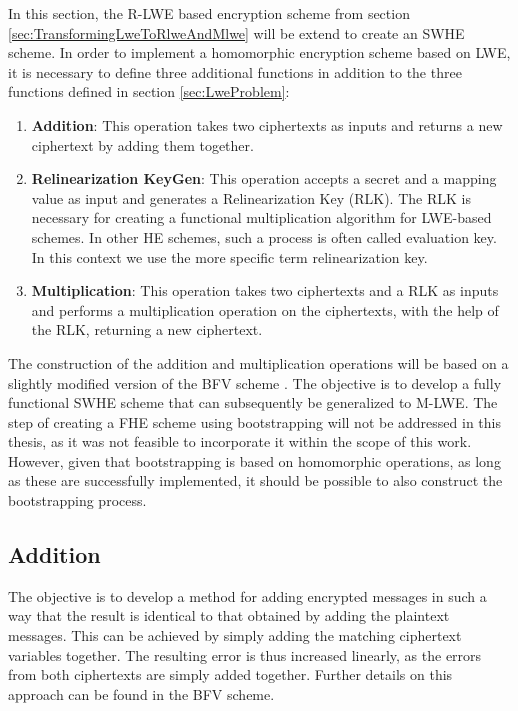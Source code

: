 In this section, the R-LWE based encryption scheme from section \ref{sec:TransformingLweToRlweAndMlwe} will be extend to create an SWHE scheme. In order to implement a homomorphic encryption scheme based on LWE, it is necessary to define three additional functions in addition to the three functions defined in section \ref{sec:LweProblem}:

\begin{enumerate}
  \item \textbf{Addition}: This operation takes two ciphertexts as inputs and returns a new ciphertext by adding them together.
  \item \textbf{Relinearization KeyGen}: This operation accepts a secret and a mapping value as input and generates a Relinearization Key (RLK). The RLK is necessary for creating a functional multiplication algorithm for LWE-based schemes. In other HE schemes, such a process is often called evaluation key. In this context we use the more specific term relinearization key.
  \item \textbf{Multiplication}: This operation takes two ciphertexts and a RLK as inputs and performs a multiplication operation on the ciphertexts, with the help of the RLK, returning a new ciphertext.
\end{enumerate}

The construction of the addition and multiplication operations will be based on a slightly modified version of the BFV scheme \cite{bfv}. The objective is to develop a fully functional SWHE scheme that can subsequently be generalized to M-LWE. The step of creating a FHE scheme using bootstrapping will not be addressed in this thesis, as it was not feasible to incorporate it within the scope of this work. However, given that bootstrapping is based on homomorphic operations, as long as these are successfully implemented, it should be possible to also construct the bootstrapping process.

\subsection*{Addition}

The objective is to develop a method for adding encrypted messages in such a way that the result is identical to that obtained by adding the plaintext messages. This can be achieved by simply adding the matching ciphertext variables together. The resulting error is thus increased linearly, as the errors from both ciphertexts are simply added together. Further details on this approach can be found in the BFV scheme.

